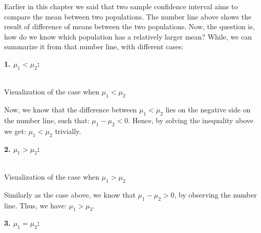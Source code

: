 Earlier in this chapter we said that two sample confidence interval aims to compare the mean between two populations. The number line above shows the result of difference of means between the two populations. Now, the question is, how do we know which population has a relatively larger mean? While, we can summarize it from that number line, with different cases:

\textbf{1. $\mu_1 < \mu_2$:}

\begin{center}
\vspace{0.5em}
\small\textbf{}\\Visualization of the case when $\mu_1 < \mu_2$
\end{center}

Now, we know that the difference between $\mu_1 < \mu_2$ lies on the negative side on the number line, such that: $\mu_1 - \mu_2 < 0$. Hence, by solving the inequality above we get: $\mu_1 < \mu_2$ trivially.

\textbf{2. $\mu_1 > \mu_2$:}

\begin{center}
\vspace{0.5em}
\small\textbf{}\\Visualization of the case when $\mu_1 > \mu_2$
\end{center}

Similarly as the case above, we know that $\mu_1 - \mu_2 > 0$, by observing the number line. Thus, we have: $\mu_1 > \mu_2$.

\textbf{3. $\mu_1 = \mu_2$:}

